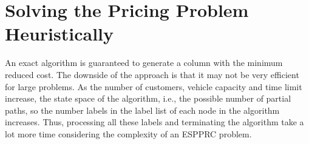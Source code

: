 \section {Solving the Pricing Problem Heuristically}
\label{heur-pri-problems}
An exact algorithm is guaranteed to generate a column with the minimum reduced cost.  
The downside of the approach is that it may not be very efficient for large problems.  
As the number of customers, vehicle capacity and time limit increase, the state space
of the algorithm, i.e., the possible number of partial paths, so the number labels in the 
label list of each node in the algorithm increases. Thus, processing all these labels 
and terminating the algorithm take a lot more time considering the complexity of an 
ESPPRC problem. 


